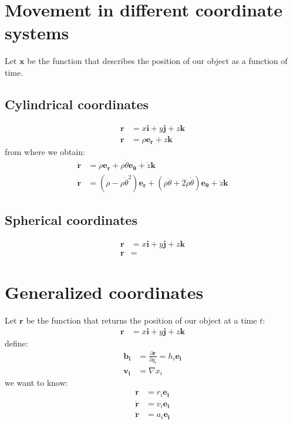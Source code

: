 \documentclass{article}
\begin{document}
\section*{Movement in different coordinate systems}
Let $\bm{x}$ be the function that describes the position of our object 
as a function of time. 
\subsection*{Cylindrical coordinates}
\begin{align*}
    \bm{r} &= x\bm{i} + y\bm{j} + z\bm{k} \\
    \bm{r} &= \rho\bm{e_r} + z\bm{k}
\end{align*}
from where we obtain:
\begin{align*}
    \bm{\dot{r}} 
    &= \dot{\rho}\bm{e_r} + \rho \dot{\theta} \bm{e_\theta} + \dot{z}\bm{k} \\
    \bm{\ddot{r}} 
    &= (\ddot{\rho} - \rho \dot{\theta}^2)\bm{e_r}
    + (\rho \ddot{\theta} + 2\dot{\rho }\dot{\theta})\bm{e_\theta}
    + \ddot{z}\bm{k}
\end{align*}

\subsection*{Spherical coordinates}
\begin{align*}
    \bm{r}
    &= x\bm{i} + y\bm{j} + z\bm{k} \\
    \bm{r}
    &= 
\end{align*}

\section*{Generalized coordinates}
Let $\bm{r}$ be the function that returns the position of our object at a time $t$:
\begin{align*}
    \bm{r} &= x\bm{i} + y\bm{j} + z\bm{k} 
\end{align*}
define:
\begin{align*}
    \bm{b_i} 
    &= \frac{\partial \bm{r}}{\partial q_i}
    = h_i\bm{e_i} \\
    \bm{v_i} &= \nabla x_i 
\end{align*}
we want to know:
\begin{align*}
    \bm{r} &= r_i \bm{e_i} \\
    \bm{\dot{r}} &= v_i \bm{e_i} \\
    \bm{\ddot{r}} &= a_i \bm{e_i}
\end{align*}
 
\end{document}
